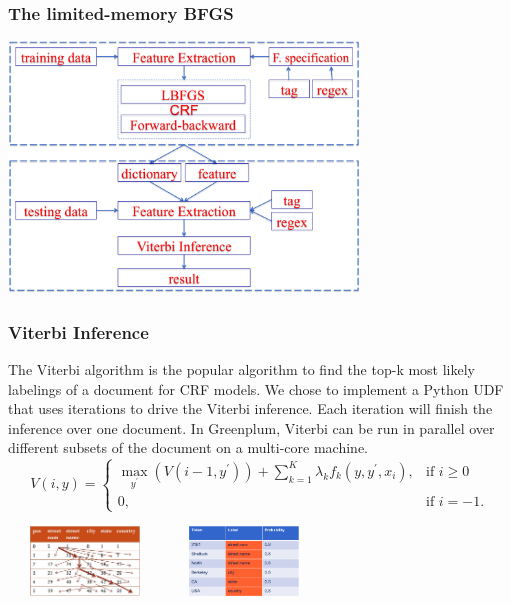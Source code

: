 \documentclass{beamer}
\begin{document}
\begin{frame}
  \frametitle{The limited-memory BFGS}
  \begin{center}
  \includegraphics[height=18em]{system.png}
  \end{center}
\end{frame}

\begin{frame}
  \frametitle{Viterbi Inference}
  The Viterbi algorithm is the popular algorithm to find the top-k most likely labelings of a document 
for CRF models. 
We chose to implement a Python UDF that uses iterations to drive the Viterbi inference. Each iteration will 
finish the inference over one document.
In Greenplum, Viterbi can be run in parallel over different subsets 
of the document on a multi-core machine.
\[
V(i,y) =
\begin{cases}
 \max_{y^\prime}(V(i-1,y^\prime)) + \textstyle \sum_{k=1}^K \lambda_kf_k(y,y^\prime,x_i), & \text{if } i\ge0 \\
 0, & \text{if } i=-1.
\end{cases}
\]
\begin{center}		             
      \includegraphics[height=5em,width=11em]{viterbip.jpg}
      \includegraphics[height=5em,width=11em]{result.png}\\
\end{center}
\end{frame}
\end{document}
